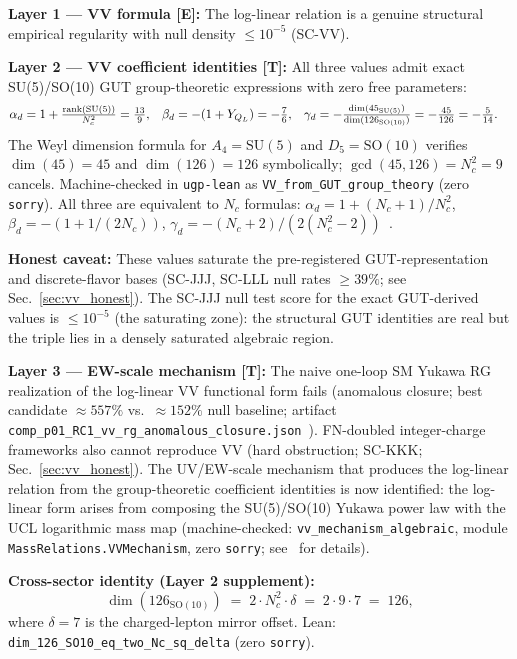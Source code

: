 \documentclass[11pt]{article}
\theoremstyle{remark}
\newcommand{\lean}[1]{\texttt{\small#1}}
\begin{document}
\begin{tcolorbox}[structural,title=VV coefficients: group-theoretic identities \textbf{[T]} with certified EW mechanism]
\label{op:vv_fp}
\textbf{Layer 1 --- VV formula [E]:} The log-linear relation is a genuine structural empirical regularity with null density $\leq 10^{-5}$ (SC-VV).

\textbf{Layer 2 --- VV coefficient identities [T]:}
All three values admit exact SU(5)/SO(10) GUT group-theoretic expressions
with zero free parameters:
\begin{align*}
\alpha_d &= 1 + \tfrac{\mathrm{rank}(\mathrm{SU}(5))}{N_c^2} = \tfrac{13}{9}, &
\beta_d &= -(1 + Y_{Q_L}) = -\tfrac{7}{6}, &
\gamma_d &= -\tfrac{\dim(45_{\rm SU(5)})}{\dim(126_{\rm SO(10)})} = -\tfrac{45}{126} = -\tfrac{5}{14}.
\end{align*}
The Weyl dimension formula for $A_4 = \mathrm{SU}(5)$ and $D_5 = \mathrm{SO}(10)$ verifies $\dim(45) = 45$ and $\dim(126) = 126$ symbolically; $\gcd(45,126) = N_c^2 = 9$ cancels.
Machine-checked in \texttt{ugp-lean} as \lean{VV\_from\_GUT\_group\_theory} (zero \texttt{sorry}).
All three are equivalent to $N_c$ formulas: $\alpha_d = 1 + (N_c{+}1)/N_c^2$, $\beta_d = -(1 + 1/(2N_c))$, $\gamma_d = -(N_c{+}2)/(2(N_c^2{-}2))$~\cite{ugp-lean}.

\textbf{Honest caveat:} These values saturate the pre-registered GUT-representation and discrete-flavor bases (SC-JJJ, SC-LLL null rates $\geq 39\%$; see Sec.~\ref{sec:vv_honest}).
The SC-JJJ null test score for the exact GUT-derived values is $\leq 10^{-5}$ (the saturating zone): the structural GUT identities are real but the triple lies in a densely saturated algebraic region.

\textbf{Layer 3 --- EW-scale mechanism [T]:}
The naive one-loop SM Yukawa RG realization of the log-linear VV functional form fails (anomalous closure; best candidate $\approx 557\%$ vs.\ $\approx 152\%$ null baseline; artifact \texttt{comp\_p01\_RC1\_vv\_rg\_anomalous\_closure.json}~\cite{Spivack2026_SM_UGP}).
FN-doubled integer-charge frameworks also cannot reproduce VV (hard obstruction; SC-KKK; Sec.~\ref{sec:vv_honest}).
The UV/EW-scale mechanism that produces the log-linear relation from the group-theoretic coefficient identities is now identified: the log-linear form arises from composing the SU(5)/SO(10) Yukawa power law with the UCL logarithmic mass map (machine-checked: \texttt{vv\_mechanism\_algebraic}, module \texttt{MassRelations.VVMechanism}, zero \texttt{sorry}; see~\cite{Spivack2026_SM_UGP} for details).

\textbf{Cross-sector identity (Layer 2 supplement):}
\[
\dim(126_{\mathrm{SO}(10)}) \;=\; 2 \cdot N_c^2 \cdot \delta \;=\; 2 \cdot 9 \cdot 7 \;=\; 126,
\]
where $\delta = 7$ is the charged-lepton mirror offset.  Lean: \lean{dim\_126\_SO10\_eq\_two\_Nc\_sq\_delta} (zero \texttt{sorry}).
\end{tcolorbox}
\end{document}
